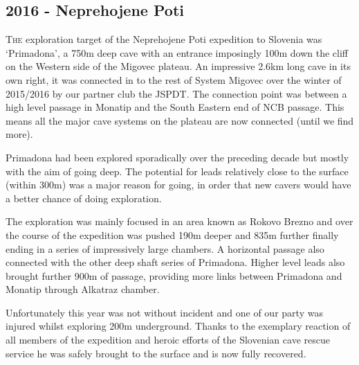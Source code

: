\begin{tcolorbox}
\chapter{2016 - Neprehojene Poti}
	\lettrine{T}{he} exploration target of the Neprehojene Poti expedition to Slovenia was `Primadona', a 750m deep cave with an entrance imposingly 100m down the cliff on the Western side of the Migovec plateau. An impressive 2.6km long cave in its own right, it was connected in to the rest of System Migovec over the winter of 2015/2016 by our partner club the JSPDT. The connection point was between a high level passage in Monatip and the South Eastern end of NCB passage. This means all the major cave systems on the plateau are now connected (until we find more).

	Primadona had been explored sporadically over the preceding decade but mostly with the aim of going deep. The potential for leads relatively close to the surface (within 300m) was a major reason for going, in order that new cavers would have a better chance of doing exploration.

	The exploration was mainly focused in an area known as Rokovo Brezno and over the course of the expedition was pushed 190m deeper and 835m further finally ending in a series of impressively large chambers.  A horizontal passage also connected with the other deep shaft series of Primadona. Higher level leads also brought further 900m of passage, providing more links between Primadona and Monatip through Alkatraz chamber.

	Unfortunately this year was not without incident and one of our party was injured whilst exploring 200m underground. Thanks to the exemplary reaction of all members of the expedition and heroic efforts of the Slovenian cave rescue service he was safely brought to the surface and is now fully recovered.
\end{tcolorbox}
